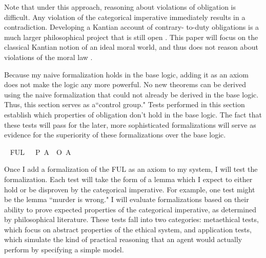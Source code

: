 \begin{isabellebody}
\begin{isamarkuptext}
Note that under this approach, reasoning about violations of obligation is difficult. Any violation of the 
categorical imperative immediately results in a contradiction. Developing a Kantian account of contrary-
to-duty obligations is a much larger philosophical project that is still open \cite{KorsgaardRTL}. This paper will focus 
on the classical Kantian notion of an ideal moral world, and thus does not reason about violations 
of the moral law \cite{idealtheory}.

Because my naive formalization holds in the base logic, adding it as an axiom does not make the logic
any more powerful. No new theorems can be derived using the naive formalization that could not already
be derived in the base logic. Thus, this section serves as a``control group." Tests performed in this
section establish which properties of obligation don't hold in the base logic. The fact that these 
tests will pass for the later, more sophisticated formalizations will serve as evidence for the superiority
of these formalizations over the base logic.%
\end{isamarkuptext}\isamarkuptrue%
\isamarkupfalse%
\ \isanewline
FUL{\isacharunderscore}{}{\isacharcolon}\ {\isachardoublequoteopen}{\isasymTurnstile}\ {\isacharparenleft}{\isacharparenleft}\isactrlbold {\isasymnot}{\isacharparenleft}{\isasymbox}\ {\isacharparenleft}P\ A{\isacharparenright}{\isacharparenright}{\isacharparenright}\ \isactrlbold {\isasymrightarrow}\ {\isacharparenleft}O\ {\isacharbraceleft}{\isacharparenleft}\isactrlbold {\isasymnot}A{\isacharparenright}{\isacharbraceright}{\isacharparenright}{\isacharparenright}{\isachardoublequoteclose}%
\begin{isamarkuptext}%
Once I add a formalization of the FUL as an axiom to my system, I will test the formalization.
Each test will take the form of a lemma which I expect to either hold or be disproven by the categorical
imperative. For example, one test might be the lemma ``murder is wrong." I will evaluate formalizations
based on their ability to prove expected properties of the categorical imperative, as determined by 
philosophical literature. These tests fall into two categories: metaethical tests, which focus on 
abstract properties of the ethical system, and application tests, which simulate the kind of practical reasoning 
that an agent would actually perform by specifying a simple model. 


\end{isamarkuptext}
\end{isabellebody}
